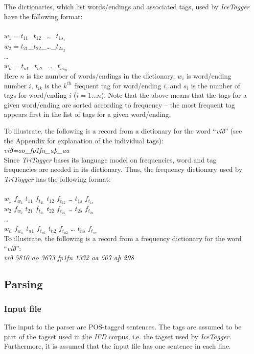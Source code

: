 \documentclass[11pt]{article}
\begin{document}
The dictionaries, which list words/endings and associated tags, used by \emph{IceTagger} have the following format: \\\\
$w_{1}=t_{11}$\_$t_{12}$\_\ldots\_$t_{1s_{1}}$ \\
$w_{2}=t_{21}$\_$t_{22}$\_\ldots\_$t_{2s_{2}}$ \\
\ldots \\
$w_{n}=t_{n1}$\_$t_{n2}$\_\ldots\_$t_{ns_{n}}$ \\

Here $n$ is the number of words/endings in the dictionary, $w_{i}$ is word/ending number $i$, $t_{ik}$ is the $k^{th}$ frequent tag for word/ending $i$, and $s_{i}$ is the number of tags for word/ending $i$ ($i=1{\ldots}n$).
Note that the above means that the tags for a given word/ending are sorted according to frequency -- the most frequent tag appears first in the list of tags for a given word/ending.

To illustrate, the following is a record from a dictionary for the word ``\emph{við}'' (see the Appendix for explanation of the individual tags): \\
\emph{við=ao\_fp1fn\_aþ\_aa} \\

Since \emph{TriTagger} bases its language model on frequencies, word and tag frequencies are needed in its dictionary. Thus, the frequency dictionary used by \emph{TriTagger} has the following format: \\\\
$w_{1}$ $f_{w_{1}}$ $t_{11}$ $f_{t_{11}}$ $t_{12}$ $f_{t_{12}}$ {\ldots} $t_{1s}$ $f_{t_{1s}}$ \\
$w_{2}$ $f_{w_{2}}$ $t_{21}$ $f_{t_{21}}$ $t_{22}$ $f_{t_{22}}$ {\ldots} $t_{2s}$ $f_{t_{2s}}$ \\
\ldots \\
$w_{n}$ $f_{w_{n}}$ $t_{n1}$ $f_{t_{n1}}$ $t_{n2}$ $f_{t_{n2}}$ {\ldots} $t_{ns}$ $f_{t_{ns}}$ \\

To illustrate, the following is a record from a frequency dictionary for the word ``\emph{við}'': \\
\emph{við 5810 ao 3673 fp1fn 1332 aa 507 aþ 298}

\subsection{Parsing}
\label{sec:fileFormatParsing}
\subsubsection{Input file}
The input to the parser are POS-tagged sentences.
The tags are assumed to be part of the tagset used in the \emph{IFD} corpus, i.e. the tagset used by \emph{IceTagger}.
Furthermore, it is assumed that the input file has one sentence in each line.
\end{document}
